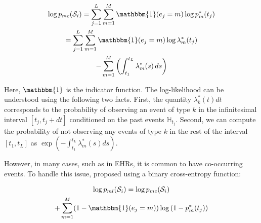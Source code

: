 \documentclass[journal,twoside,web]{ieeecolor}
\begin{document}
 \begin{multline} \label{eq:CIF-mc}
     \log p_{mc}(\mathcal{S}_{i})  =  \sum_{j = 1}^{L}\sum_{m = 1}^{M} \mathbbm{1}(e_j=m)   \log p_m^{*}(t_j) \\   
     = \sum_{j = 1}^{L}\sum_{m = 1}^{M} \mathbbm{1}(e_j=m)   \log \lambda_m^{*}(t_j)\\
     -\sum_{m = 1}^{M} \left(   \int_{t_1}^{t_L}  \lambda_m^{*}(s) \,ds  \right)
 \end{multline} 
 
 Here, $\mathbbm{1}$ is the indicator function. The log-likelihood can be understood using the following two facts. First, the quantity $\lambda_k^{*}(t)dt$ corresponds to the probability of observing an event of type $k$ in the infinitesimal interval $[t_j,t_j+dt]$ conditioned on the past events $\mathbb{H}_{t_j}$. Second, we can compute the probability of not observing any events of type $k$ in the rest of the interval $[t_1,t_L]$ as $\exp \left(-\int_{t_1}^{t_L}  \lambda_m^{*}(s) ds\right)$.
 
 However, in many cases, such as in EHRs, it is common to have co-occurring events. To handle this issue, \cite*{enguehardNeuralTemporalPoint2020} proposed using a binary cross-entropy function:
 
 
 \begin{multline} \label{eq:CIF-ml}
     \log p_{ml}(\mathcal{S}_{i}) = \log p_{mc}(\mathcal{S}_{i}) \\
     + \sum_{m = 1}^{M} (1-\mathbbm{1}(e_j=m)) \log \left(1-p_m^{*}(t_j)  \right)
 \end{multline} 
 
 
 
\end{document}
